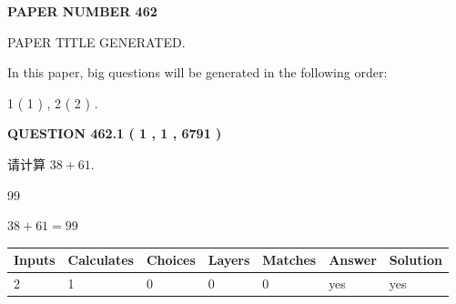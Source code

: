 \documentclass{ctexart}
\begin{document}
   
 {\textbf{ \Large{ PAPER NUMBER  462  }}}
   
   
\vspace{0.2in}
   
   
   
   
   
   
   
   
 \vspace{0.2in}
 
 
 
 
   
   
 PAPER TITLE GENERATED.
   
   
   
\vspace{0.2in}
   
In this paper, big questions will be generated in the following order: 
   
   
   1 ( 1 )
 ,
   2 ( 2 )
 .
  
\vspace{0.2in}
  
{\textbf{\Large{QUESTION
462.1 
 ( 1 , 1 , 6791 )
}}}
  
  
 
请计算 $ %
38 +  %
61 $.
 
 
 
\noindent{}
 
 

99
 
 
\noindent{}
 
 

 
 
 
\noindent{}
 
 

$ %
38 +  %
61=   %
99$
 
 
\noindent{}
 
 

 
   
   
   
   
\noindent\begin{tabular}{|l|l|l|l|l|l|l|}
 \hline
Inputs & Calculates & Choices & Layers & Matches & Answer & Solution \\ \hline
 2  & 
 1  & 
 0
  & 
 0  & 
 0  & 
  yes & 
  yes 
  \\ \hline
 \end{tabular}
   
\end{document}
